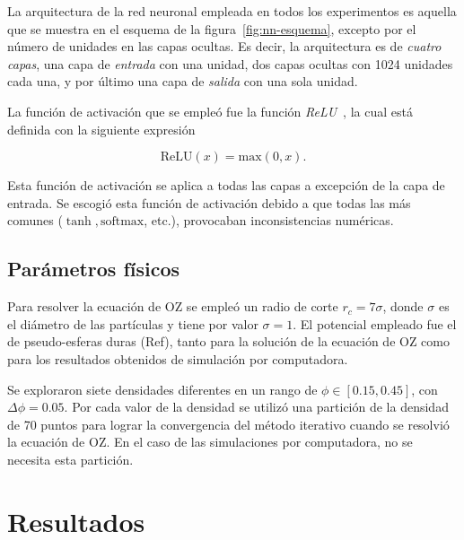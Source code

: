La arquitectura de la red neuronal empleada en todos los experimentos es aquella que se
muestra en el esquema de la figura~\ref{fig:nn-esquema}, excepto por el número de unidades
en las capas ocultas.
Es decir, la arquitectura es de \emph{cuatro capas}, una capa de \emph{entrada} con una
unidad, dos capas ocultas con 1024 unidades cada una, y por último una capa de \emph{salida}
con una sola unidad.

La función de activación que se empleó fue la función \emph{ReLU}~\cite{glorotDeepSparseRectifier2011},
la cual está definida con la siguiente expresión

\begin{equation*}
    \text{ReLU}(x) = \text{max}{(0, x)} .
\end{equation*}

Esta función de activación se aplica a todas las capas a excepción de la capa de entrada.
Se escogió esta función de activación debido a que todas las más comunes ($\tanh, \text{softmax}$, etc.),
provocaban inconsistencias numéricas.

\subsection{Parámetros físicos}

Para resolver la ecuación de OZ se empleó un radio de corte $r_c=7\sigma$, donde $\sigma$
es el diámetro de las partículas y tiene por valor $\sigma=1$.
El potencial empleado fue el de pseudo-esferas duras (Ref), tanto para la solución de la ecuación
de OZ como para los resultados obtenidos de simulación por computadora.

Se exploraron siete densidades diferentes en un rango de
$\phi \in [\num{0.15}, \num{0.45}]$, con $\Delta \phi = \num{0.05}$. Por cada valor
de la densidad se utilizó una partición de la densidad de 70 puntos para lograr la
convergencia del método iterativo cuando se resolvió la ecuación de OZ. En el caso de las
simulaciones por computadora, no se necesita esta partición.

\section{Resultados}

